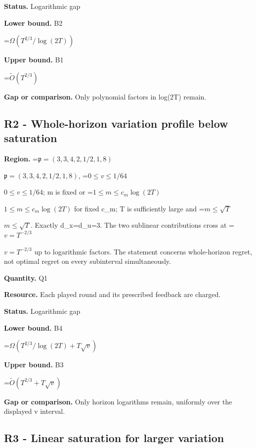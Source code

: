 \documentclass[10pt,a4paper]{article}
\newcommand{\AtlasMath}[1]{\par\begingroup\centering\setbox0=\hbox{$\displaystyle #1$}\ifdim\wd0>1.4\linewidth\typeout{ATLAS WIDE FORMULA: \the\wd0}\fi\ifdim\wd0>\linewidth\resizebox{\linewidth}{!}{\box0}\else\box0\fi\par\endgroup}
\newcommand{\AtlasInlineMath}[1]{\begingroup\setbox0=\hbox{$#1$}\ifdim\wd0>.4\linewidth\endgroup\AtlasMath{#1}\else\endgroup$#1$\fi}
\begin{document}
\textbf{Status.} Logarithmic gap



\textbf{Lower bound.} B2



\AtlasMath{\Omega(T^{2/3}/\log(2T))}


\textbf{Upper bound.} B1



\AtlasMath{\widetilde O(T^{2/3})}


\textbf{Gap or comparison.} Only polynomial factors in log(2T) remain.



\subsection{R2 - Whole-horizon variation profile below saturation}


\textbf{Region.} \AtlasInlineMath{\mathfrak p=(3,3,4,2,1/2,1,8)}, \AtlasInlineMath{0\le v\le1/64}; m is fixed or \AtlasInlineMath{1\le m\le c_m\log(2T)} for fixed c\_m; T is sufficiently large and \AtlasInlineMath{m\le\sqrt T}. Exactly d\_x=d\_u=3. The two sublinear contributions cross at \AtlasInlineMath{v=T^{-2/3}} up to logarithmic factors. The statement concerns whole-horizon regret, not optimal regret on every subinterval simultaneously.



\textbf{Quantity.} Q1



\textbf{Resource.} Each played round and its prescribed feedback are charged.



\textbf{Status.} Logarithmic gap



\textbf{Lower bound.} B4



\AtlasMath{\Omega(T^{2/3}/\log(2T)+T\sqrt v)}


\textbf{Upper bound.} B3



\AtlasMath{\widetilde O(T^{2/3}+T\sqrt v)}


\textbf{Gap or comparison.} Only horizon logarithms remain, uniformly over the displayed v interval.



\subsection{R3 - Linear saturation for larger variation}
\end{document}
